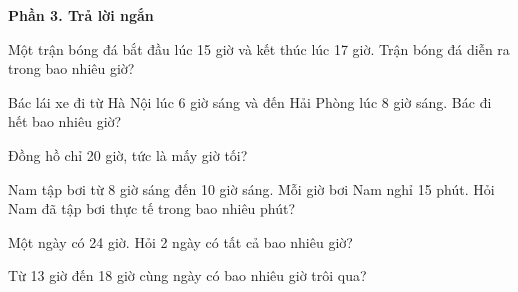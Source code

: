 \textbf{Phần 3. Trả lời ngắn}

\begin{ex} %
Một trận bóng đá bắt đầu lúc 15 giờ và kết thúc lúc 17 giờ. Trận bóng đá diễn ra trong bao nhiêu giờ?
\end{ex}

\begin{ex} %
Bác lái xe đi từ Hà Nội lúc 6 giờ sáng và đến Hải Phòng lúc 8 giờ sáng. Bác đi hết bao nhiêu giờ?
\end{ex}

\begin{ex} %
Đồng hồ chỉ 20 giờ, tức là mấy giờ tối?
\end{ex}

\begin{ex} %
Nam tập bơi từ 8 giờ sáng đến 10 giờ sáng. Mỗi giờ bơi Nam nghỉ 15 phút. Hỏi Nam đã tập bơi thực tế trong bao nhiêu phút?
\end{ex}

\begin{ex} %
Một ngày có 24 giờ. Hỏi 2 ngày có tất cả bao nhiêu giờ?
\end{ex}

\begin{ex} %
Từ 13 giờ đến 18 giờ cùng ngày có bao nhiêu giờ trôi qua?
\end{ex}
